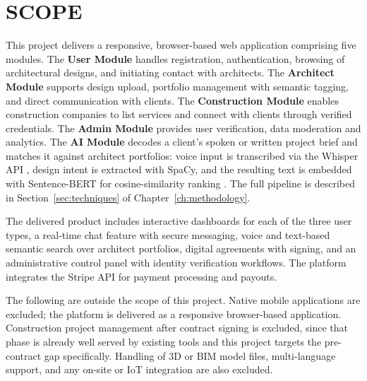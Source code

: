
\section{SCOPE}
\label{sec:scope}

This project delivers a responsive, browser-based web application
comprising five modules. The \textbf{User Module} handles registration,
authentication, browsing of architectural designs, and initiating
contact with architects. The \textbf{Architect Module} supports design
upload, portfolio management with semantic tagging, and direct
communication with clients. The \textbf{Construction Module} enables
construction companies to list services and connect with clients through
verified credentials. The \textbf{Admin Module} provides user
verification, data moderation and analytics. The \textbf{AI Module}
decodes a client's spoken or written project brief and matches it
against architect portfolios: voice input is transcribed via the
Whisper API \cite{radford2022whisper}, design intent is extracted with
SpaCy, and the resulting text is embedded with Sentence-BERT for
cosine-similarity ranking \cite{reimers2019sbert}. The full pipeline is
described in Section~\ref{sec:techniques} of Chapter~\ref{ch:methodology}.

The delivered product includes interactive dashboards for each of the
three user types, a real-time chat feature with secure messaging,
voice and text-based semantic search over architect portfolios, digital
agreements with signing, and an administrative control panel with
identity verification workflows. The platform integrates the Stripe API
for payment processing and payouts.

The following are outside the scope of this project. Native mobile
applications are excluded; the platform is delivered as a responsive
browser-based application. Construction project management after
contract signing is excluded, since that phase is already well served by
existing tools and this project targets the pre-contract gap
specifically. Handling of 3D or BIM model files, multi-language
support, and any on-site or IoT integration are also excluded.

